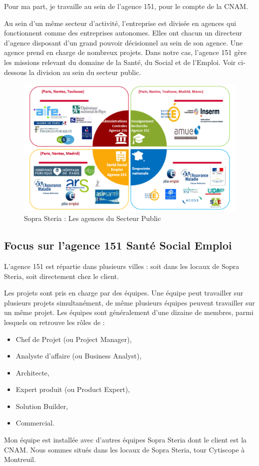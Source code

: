 Pour ma part, je travaille au sein de l’agence 151, pour le compte de la CNAM.

Au sein d'un même secteur d'activité, l'entreprise est divisée en agences qui fonctionnent comme des entreprises autonomes. Elles ont chacun un directeur d'agence disposant d'un grand pouvoir décisionnel au sein de son agence. Une agence prend en charge de nombreux projets. Dans notre cas, l'agence 151 gère les missions relevant du domaine de la Santé, du Social et de l’Emploi.
Voir ci-dessous la division au sein du secteur public.

\begin{figure}[!h]
\centering
\includegraphics[width=1\textwidth]{images/divisionSecteurPublic.png}
\caption{Sopra Steria : Les agences du Secteur Public}
\end{figure}

\subsection{Focus sur l'agence 151 Santé Social Emploi}

L'agence 151 est répartie dans plusieurs villes : soit dans les locaux de Sopra Steria, soit directement chez le client.

Les projets sont pris en charge par des équipes. Une équipe peut travailler sur plusieurs projets simultanément, de même plusieurs équipes peuvent travailler sur un même projet. Les équipes sont généralement d’une dizaine de membres, parmi lesquels on retrouve les rôles de :
\begin{itemize}
    \item Chef de Projet (ou Project Manager),
    \item Analyste d’affaire (ou Business Analyst),
    \item Architecte,
    \item Expert produit (ou Product Expert),
    \item Solution Builder,
    \item Commercial.
\end{itemize}
\vspace{\baselineskip}
Mon équipe est installée avec d'autres équipes Sopra Steria dont le client est la CNAM. Nous sommes situés dans les locaux de Sopra Steria, tour Cytiscope à Montreuil. 

